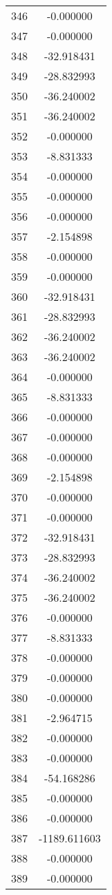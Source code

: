 \documentclass[12pt]{article}
\begin{document}
\begin{longtable}{@{}cc@{}}
346 & -0.000000 \\
347 & -0.000000 \\
348 & -32.918431 \\
349 & -28.832993 \\
350 & -36.240002 \\
351 & -36.240002 \\
352 & -0.000000 \\
353 & -8.831333 \\
354 & -0.000000 \\
355 & -0.000000 \\
356 & -0.000000 \\
357 & -2.154898 \\
358 & -0.000000 \\
359 & -0.000000 \\
360 & -32.918431 \\
361 & -28.832993 \\
362 & -36.240002 \\
363 & -36.240002 \\
364 & -0.000000 \\
365 & -8.831333 \\
366 & -0.000000 \\
367 & -0.000000 \\
368 & -0.000000 \\
369 & -2.154898 \\
370 & -0.000000 \\
371 & -0.000000 \\
372 & -32.918431 \\
373 & -28.832993 \\
374 & -36.240002 \\
375 & -36.240002 \\
376 & -0.000000 \\
377 & -8.831333 \\
378 & -0.000000 \\
379 & -0.000000 \\
380 & -0.000000 \\
381 & -2.964715 \\
382 & -0.000000 \\
383 & -0.000000 \\
384 & -54.168286 \\
385 & -0.000000 \\
386 & -0.000000 \\
387 & -1189.611603 \\
388 & -0.000000 \\
389 & -0.000000 \\

\end{longtable}
\end{document}
